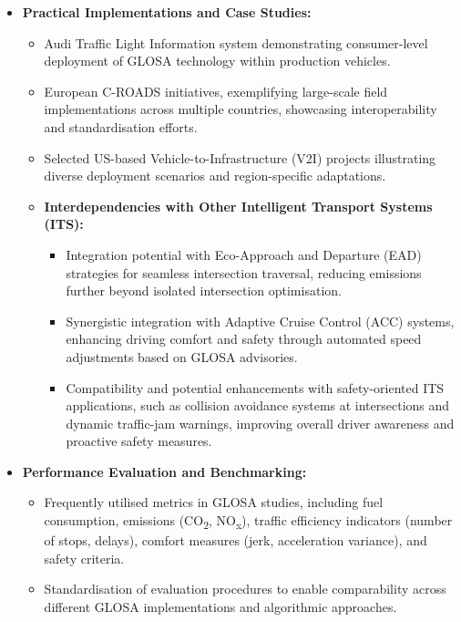\begin{itemize}
    \item \textbf{Practical Implementations and Case Studies:}
    \begin{itemize}
        \item Audi Traffic Light Information system demonstrating consumer-level deployment of GLOSA technology within production vehicles.
        \item European C-ROADS initiatives, exemplifying large-scale field implementations across multiple countries, showcasing interoperability and standardisation efforts.
        \item Selected US-based Vehicle-to-Infrastructure (V2I) projects illustrating diverse deployment scenarios and region-specific adaptations.
        \item \textbf{Interdependencies with Other Intelligent Transport Systems (ITS):}
        \begin{itemize}
            \item Integration potential with Eco-Approach and Departure (EAD) strategies for seamless intersection traversal, reducing emissions further beyond isolated intersection optimisation.
            \item Synergistic integration with Adaptive Cruise Control (ACC) systems, enhancing driving comfort and safety through automated speed adjustments based on GLOSA advisories.
            \item Compatibility and potential enhancements with safety-oriented ITS applications, such as collision avoidance systems at intersections and dynamic traffic-jam warnings, improving overall driver awareness and proactive safety measures.
        \end{itemize}
    \end{itemize}

    \item \textbf{Performance Evaluation and Benchmarking:}
    \begin{itemize}
        \item Frequently utilised metrics in GLOSA studies, including fuel consumption, emissions (CO\textsubscript{2}, NO\textsubscript{x}), traffic efficiency indicators (number of stops, delays), comfort measures (jerk, acceleration variance), and safety criteria.
        \item Standardisation of evaluation procedures to enable comparability across different GLOSA implementations and algorithmic approaches.
    \end{itemize}


\end{itemize}
